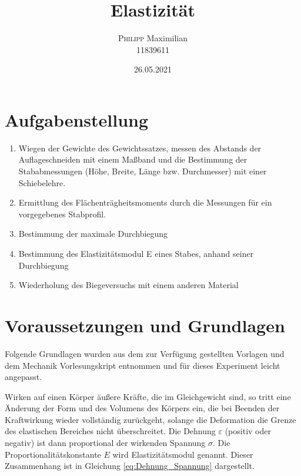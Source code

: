 \documentclass[11pt,ngerman]{scrartcl}
\begin{document}
\title{Elastizität}
\author{\textsc{Philipp} Maximilian\\11839611}
\date{26.05.2021}
\maketitle

\tableofcontents
\newpage
\section{Aufgabenstellung}
\label{sec:aufgabenstellung}

\begin{enumerate}
	\item Wiegen der Gewichte des Gewichtssatzes, messen des Abstands
	      der Auflageschneiden mit einem Maßband und die Bestimmung der Stababmessungen (Höhe,
	      Breite, Länge bzw.  Durchmesser) mit einer Schiebelehre.
	\item Ermittlung des Flächenträgheitsmoments durch die Messungen für ein vorgegebenes Stabprofil.
	\item Bestimmung der maximale Durchbiegung
	\item Bestimmung des Elastizitätsmodul E eines Stabes, anhand seiner Durchbiegung
	\item Wiederholung des Biegeversuchs mit einem anderen Material
\end{enumerate}

\section{Voraussetzungen und Grundlagen} \label{sec:voraussetzungen_grundlagen}
Folgende Grundlagen wurden aus dem zur Verfügung gestellten Vorlagen
\cite{vorlageelast1} \cite{vorlageelast2}  und dem Mechanik Vorlesungskript \cite{Knoll2020}
entnommen und für dieses Experiment leicht angepasst.

Wirken auf einen Körper äußere Kräfte, die im Gleichgewicht sind, so tritt eine
Änderung der Form und des Volumens des Körpers ein, die bei Beenden der
Kraftwirkung wieder vollständig zurückgeht, solange die Deformation die Grenze
des elastischen Bereiches nicht überschreitet. Die Dehnung $\varepsilon$
(positiv oder negativ) ist dann proportional der wirkenden Spannung $\sigma$.
Die Proportionalitätskonstante $E$ wird Elastizitätsmodul genannt. Dieser
Zusammenhang ist in Gleichung \ref{eq:Dehnung_Spannung} dargestellt.
\end{document}
